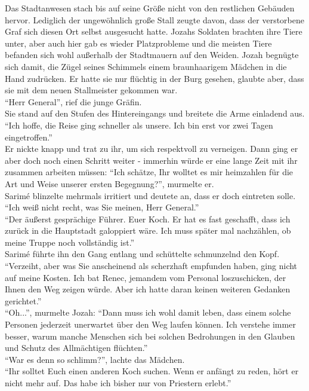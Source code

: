 Das Stadtanwesen stach bis auf seine Größe nicht von den restlichen Gebäuden hervor. Lediglich der 
ungewöhnlich große Stall zeugte davon, dass der verstorbene Graf sich diesen Ort selbst ausgesucht 
hatte. Jozahs Soldaten brachten ihre Tiere unter, aber auch hier gab es wieder Platzprobleme und 
die meisten Tiere befanden sich wohl außerhalb der Stadtmauern auf den Weiden. Jozah begnügte sich 
damit, die Zügel seines Schimmels einem braunhaarigem Mädchen in die Hand zudrücken. Er hatte sie 
nur flüchtig in der Burg gesehen, glaubte aber, dass sie mit dem neuen Stallmeister gekommen war.\\
``Herr General'', rief die junge Gräfin.\\
Sie stand auf den Stufen des Hintereingangs und breitete die Arme einladend aus. ``Ich hoffe, die 
Reise ging schneller als unsere. Ich bin erst vor zwei Tagen eingetroffen.''\\
Er nickte knapp und trat zu ihr, um sich respektvoll zu verneigen. Dann ging er aber doch noch 
einen Schritt weiter - immerhin würde er eine lange Zeit mit ihr zusammen arbeiten müssen: 
``Ich schätze, Ihr wolltet es mir heimzahlen für die Art und Weise unserer ersten Begegnung?'', 
murmelte er.\\
Sarimé blinzelte mehrmals irritiert und deutete an, dass er doch eintreten solle. ``Ich weiß nicht 
recht, was Sie meinen, Herr General.''\\
``Der äußerst gesprächige Führer. Euer Koch. Er hat es fast geschafft, dass ich zurück in die 
Hauptstadt galoppiert wäre. Ich muss später mal nachzählen, ob meine Truppe noch vollständig 
ist.''\\
Sarimé führte ihn den Gang entlang und schüttelte schmunzelnd den Kopf. ``Verzeiht, aber was Sie 
anscheinend als scherzhaft empfunden haben, ging nicht auf meine Kosten. Ich bat Renec, jemandem 
vom Personal loszuschicken, der Ihnen den Weg zeigen würde. Aber ich hatte daran keinen weiteren 
Gedanken gerichtet.''\\
``Oh...'', murmelte Jozah: ``Dann muss ich wohl damit leben, dass einem solche Personen jederzeit 
unerwartet über den Weg laufen können. Ich verstehe immer besser, warum manche Menschen sich bei 
solchen Bedrohungen in den Glauben und Schutz des Allmächtigen flüchten.''\\
``War es denn so schlimm?'', lachte das Mädchen.\\
``Ihr solltet Euch einen anderen Koch suchen. Wenn er anfängt zu reden, hört er nicht mehr auf. Das 
habe ich bisher nur von Priestern erlebt.''
